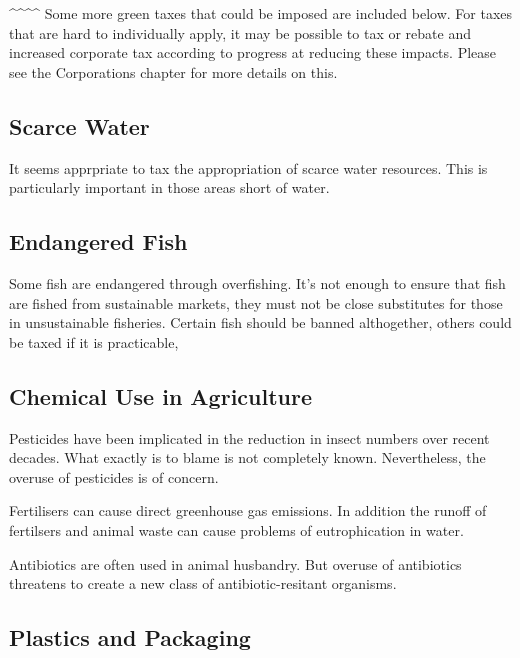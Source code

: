 \documentclass[]{tufte-handout}
\begin{document}
\^{}\^{}\^{}\^{} Some more green taxes that could be imposed are
included below. For taxes that are hard to individually apply, it may be
possible to tax or rebate and increased corporate tax according to
progress at reducing these impacts. Please see the Corporations chapter
for more details on this.

\hypertarget{scarce-water}{%
\subsection{Scarce Water}\label{scarce-water}}

It seems apprpriate to tax the appropriation of scarce water resources.
This is particularly important in those areas short of water.

\hypertarget{endangered-fish}{%
\subsection{Endangered Fish}\label{endangered-fish}}

Some fish are endangered through overfishing. It's not enough to ensure
that fish are fished from sustainable markets, they must not be close
substitutes for those in unsustainable fisheries. Certain fish should be
banned althogether, others could be taxed if it is practicable,

\hypertarget{chemical-use-in-agriculture}{%
\subsection{Chemical Use in
Agriculture}\label{chemical-use-in-agriculture}}

Pesticides have been implicated in the reduction in insect numbers over
recent decades. What exactly is to blame is not completely known.
Nevertheless, the overuse of pesticides is of concern.

Fertilisers can cause direct greenhouse gas emissions. In addition the
runoff of fertilsers and animal waste can cause problems of
eutrophication in water.

Antibiotics are often used in animal husbandry. But overuse of
antibiotics threatens to create a new class of antibiotic-resitant
organisms.

\hypertarget{plastics-and-packaging}{%
\subsection{Plastics and Packaging}\label{plastics-and-packaging}}
\end{document}
